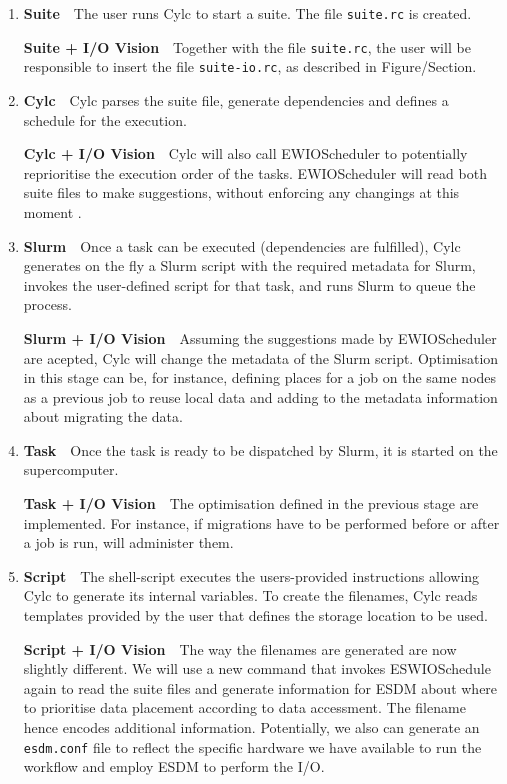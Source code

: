 \documentclass[a4paper]{article}
\begin{document}
\begin{enumerate}

  \item \textbf{Suite}\ \ The user runs Cylc to start a suite. The file \texttt{suite.rc} is created.

  \textbf{Suite + I/O Vision}\ \ Together with the file \texttt{suite.rc}, the user will be responsible to insert the file \texttt{suite-io.rc}, as described in Figure/Section.

  \item \textbf{Cylc}\ \ Cylc parses the suite file, generate dependencies and defines a schedule for the execution.

  \textbf{Cylc + I/O Vision}\ \ Cylc will also call EWIOScheduler to potentially reprioritise the execution order of the tasks.
  EWIOScheduler will read both suite files to make suggestions, without enforcing any changings at this moment {\color{cyan}{why?}}.

  \item \textbf{Slurm}\ \ Once a task can be executed (dependencies are fulfilled), Cylc generates on the fly a Slurm script with the required metadata for Slurm, invokes the user-defined script for that task, and runs Slurm to queue the process.

  \textbf{Slurm + I/O Vision}\ \ Assuming the suggestions made by EWIOScheduler are acepted, Cylc will change the metadata of the Slurm script. Optimisation in this stage can be, for instance, defining places for a job on the same nodes as a previous job to reuse local data {\color{cyan}{NextgenIO?}} and adding to the metadata information about migrating the data.

  \item \textbf{Task}\ \ Once the task is ready to be dispatched by Slurm, it is started on the supercomputer.

  \textbf{Task + I/O Vision}\ \ The optimisation defined in the previous stage are implemented. For instance, if migrations have to be performed before or after a job is run, \sout{{\color{cyan}{it}}} {\color{cyan}{Slurm}} will administer them.

  \item \textbf{Script}\ \ The shell-script executes the users-provided instructions allowing Cylc to generate its internal variables. To create the filenames, Cylc reads templates provided by the user that defines the storage location to be used.

  \textbf{Script + I/O Vision}\ \ The way the filenames are generated are now slightly different. We will use a new command that invokes ESWIOSchedule again {\color{cyan}{Slurm is calling ESWIOSchedule?}} to read the suite files and generate information for ESDM about where to prioritise {\color{cyan}{prioritise ==> Is this the right word here?}} data placement according to data accessment. The filename hence encodes additional information.
  Potentially, we also can generate an \texttt{esdm.conf} file to reflect the specific hardware we have available to run the workflow and employ ESDM to perform the I/O.


\end{enumerate}
\end{document}
